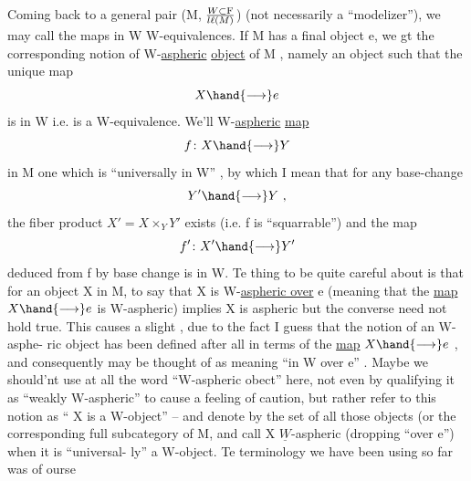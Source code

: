 Coming back to a general pair (M, $W\subset \mathrm{F}\over{l}{\ell}(M)$) (not necessarily a
``modelizer''), we may call the maps in W W-equivalences. If M has a
final object e, we gt the corresponding notion of W-\uline{aspheric} \uline{object} of
M , namely an object such that the unique map
\[ X \hand{\longrightarrow} e \]
is in W i.e. is a W-equivalence. We'll   W-\uline{aspheric} \uline{map}
\[ f\colon X \hand{\longrightarrow} Y \]
in M   one which is ``universally in W'' , by which I mean
that for any base-change
\[ Y' \hand{\longrightarrow} Y \ , \]
the fiber product $X'=X\times_Y Y'$ exists (i.e. f is ``squarrable'') and the
map
\[ f'\colon X' \hand{\longrightarrow} Y' \]
deduced from f by base change is in W. Te thing to be quite careful
about is that for an object X in M, to say that X is W-\uline{aspheric over} e
(meaning that the \uline{map} $X \hand{\longrightarrow} e$\deleted{\unsure{)}} is W-aspheric) implies X is aspheric 
 but the converse need not hold true. This causes a slight   
 , due to the fact I guess that the notion of an W-asphe-%
ric object has been defined after all in terms of the \uline{map} $X \hand{\longrightarrow} e$ , and
consequently may be thought of as meaning  ``in W over e'' . Maybe we
should'nt use at all the word ``W-aspheric obect'' here, not even by
qualifying it as ``weakly W-aspheric'' to cause a feeling of caution, but
rather refer to this notion as `` X is a W-object'' -- and denote by 
the set of all those objects (or the corresponding full subcategory of M\hand{)},
and  call X $\underline{W}$-aspheric (dropping ``over e'')\hand{*} when it is ``universal-%
ly'' a W-object. Te terminology we have been using so far was of ourse
